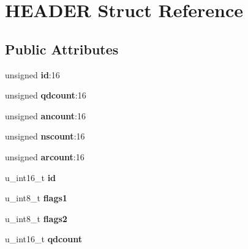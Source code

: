 \hypertarget{struct_h_e_a_d_e_r}{
\section{HEADER Struct Reference}
\label{struct_h_e_a_d_e_r}
}
\subsection*{Public Attributes}
\begin{DoxyCompactItemize}
\item 
\hypertarget{struct_h_e_a_d_e_r_aef1d48d86fb1f3ee012ab3b2458ae9e7}{
unsigned {\bfseries id}:16}
\label{struct_h_e_a_d_e_r_aef1d48d86fb1f3ee012ab3b2458ae9e7}

\item 
\hypertarget{struct_h_e_a_d_e_r_a0e51191676ae937ba5776ee8c014f97d}{
unsigned {\bfseries qdcount}:16}
\label{struct_h_e_a_d_e_r_a0e51191676ae937ba5776ee8c014f97d}

\item 
\hypertarget{struct_h_e_a_d_e_r_ab87d4b06b8ef1853284739cbafa5bb60}{
unsigned {\bfseries ancount}:16}
\label{struct_h_e_a_d_e_r_ab87d4b06b8ef1853284739cbafa5bb60}

\item 
\hypertarget{struct_h_e_a_d_e_r_a0a5a2d35731f35af169d808f697c80cd}{
unsigned {\bfseries nscount}:16}
\label{struct_h_e_a_d_e_r_a0a5a2d35731f35af169d808f697c80cd}

\item 
\hypertarget{struct_h_e_a_d_e_r_ab4a7f4363fdd0cd7934eec9a9072d1c0}{
unsigned {\bfseries arcount}:16}
\label{struct_h_e_a_d_e_r_ab4a7f4363fdd0cd7934eec9a9072d1c0}

\item 
\hypertarget{struct_h_e_a_d_e_r_ab044cac53a463f236c833122f429572a}{
u\_\-int16\_\-t {\bfseries id}}
\label{struct_h_e_a_d_e_r_ab044cac53a463f236c833122f429572a}

\item 
\hypertarget{struct_h_e_a_d_e_r_a66d8cc282244b53934a4265647bfd147}{
u\_\-int8\_\-t {\bfseries flags1}}
\label{struct_h_e_a_d_e_r_a66d8cc282244b53934a4265647bfd147}

\item 
\hypertarget{struct_h_e_a_d_e_r_a625164ff4d809888f6140c65575601ef}{
u\_\-int8\_\-t {\bfseries flags2}}
\label{struct_h_e_a_d_e_r_a625164ff4d809888f6140c65575601ef}

\item 
\hypertarget{struct_h_e_a_d_e_r_a986076b09f64ba7fab8addc2ebf0766c}{
u\_\-int16\_\-t {\bfseries qdcount}}
\label{struct_h_e_a_d_e_r_a986076b09f64ba7fab8addc2ebf0766c}


\end{DoxyCompactItemize}
